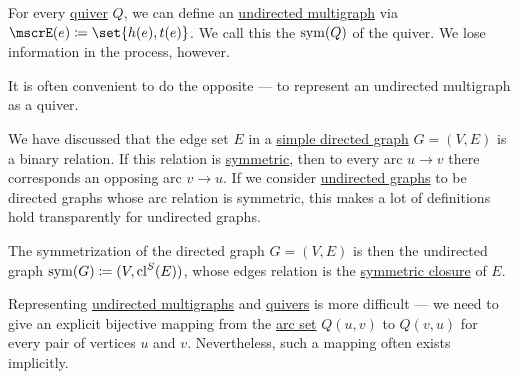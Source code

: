 \begin{remark}\label{rem:undirected_graphs_as_directed}
  For every \hyperref[def:graph/quiver]{quiver} \( Q \), we can define an \hyperref[def:graph/undirected_multigraph]{undirected multigraph} via \( \mscrE(e) \coloneqq \set{ h(e), t(e) } \). We call this the  \( \operatorname{sym}(Q) \) of the quiver. We lose information in the process, however.

  It is often convenient to do the opposite --- to represent an undirected multigraph as a quiver.

  We have discussed that the edge set \( E \) in a \hyperref[def:graph/simple_directed]{simple directed graph} \( G = (V, E) \) is a binary relation. If this relation is \hyperref[def:binary_relation/symmetric]{symmetric}, then to every arc \( u \to v \) there corresponds an opposing arc \( v \to u \). If we consider \hyperref[def:graph/simple_directed]{undirected graphs} to be directed graphs whose arc relation is symmetric, this makes a lot of definitions hold transparently for undirected graphs.

  The symmetrization of the directed graph \( G = (V, E) \) is then the undirected graph \( \operatorname{sym}(G) \coloneqq (V, \operatorname{cl}^S(E)) \), whose edges relation is the \hyperref[def:relation_closures/symmetric]{symmetric closure} of \( E \).

  Representing \hyperref[def:graph/undirected_multigraph]{undirected multigraphs} and \hyperref[def:graph/quiver]{quivers} is more difficult --- we need to give an explicit bijective mapping from the \hyperref[eq:def:graph/quiver/arc_set]{arc set} \( Q(u, v) \) to \( Q(v, u) \) for every pair of vertices \( u \) and \( v \). Nevertheless, such a mapping often exists implicitly.
\end{remark}

